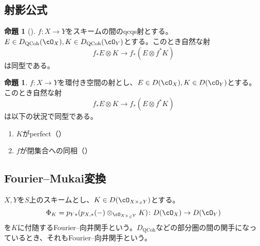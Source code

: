 \documentclass[uplatex, a4paper, dvipdfmx]{jsarticle}
\theoremstyle{definition}
\newtheorem{proposition}[theorem]{命題}
\DeclareMathOperator{\QCoh}{\mathrm{QCoh}}
\begin{document}
\subsection{射影公式}

\begin{proposition}[{\cite[\href{https://stacks.math.columbia.edu/tag/08EU}{Tag 08EU}]{stacks-project}}]\label{prop:projection-formula-for-qcoh}
    $f \colon X \to Y$をスキームの間のqcqs射とする。$E \in D_{\QCoh}(\cO_X), K \in D_{\QCoh}(\cO_Y)$とする。このとき自然な射
    \begin{equation}
        f_*E \otimes K \to f_*(E \otimes f^*K)
    \end{equation}
    は同型である。
\end{proposition}
\begin{proposition}\label{prop:projection-formula-for-modules}
    $f \colon X \to Y$を環付き空間の射とし、$E \in D(\cO_X), K \in D(\cO_Y)$とする。このとき自然な射
    \begin{equation}
        f_*E \otimes K \to f_*(E \otimes f^*K)
    \end{equation}
    は以下の状況で同型である。
    \begin{enumerate}
        \item $K$がperfect（{\cite[\href{https://stacks.math.columbia.edu/tag/0B54}{Tag 0B54}]{stacks-project}}）
        \item $f$が閉集合への同相（{\cite[\href{https://stacks.math.columbia.edu/tag/0B55}{Tag 0B55}]{stacks-project}}）
    \end{enumerate}
\end{proposition}

\subsection{Fourier--Mukai変換}
$X, Y$を$S$上のスキームとし、$K \in D(\cO_{X \times_S Y})$とする。
\begin{equation}
    \Phi_K = p_{Y*}(p_{X,*}(-)\otimes_{\cO_{X \times_S Y}} K) \colon D(\cO_X) \to D(\cO_Y)
\end{equation}
を$K$に付随するFourier--向井関手という。$D_{\QCoh}$などの部分圏の間の関手になっているとき、それもFourier--向井関手という。
\end{document}
